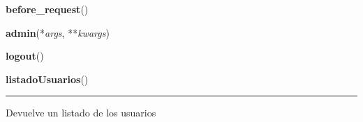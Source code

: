     \label{app:views:before_request}

    \vspace{0.5ex}

\hspace{.8\funcindent}\begin{boxedminipage}{\funcwidth}

    \raggedright \textbf{before\_request}()

\setlength{\parskip}{2ex}
\setlength{\parskip}{1ex}
    \end{boxedminipage}

    \label{app:views:admin}

    \vspace{0.5ex}

\hspace{.8\funcindent}\begin{boxedminipage}{\funcwidth}

    \raggedright \textbf{admin}(*\textit{args}, **\textit{kwargs})

\setlength{\parskip}{2ex}
\setlength{\parskip}{1ex}
    \end{boxedminipage}

    \label{app:views:logout}

    \vspace{0.5ex}

\hspace{.8\funcindent}\begin{boxedminipage}{\funcwidth}

    \raggedright \textbf{logout}()

\setlength{\parskip}{2ex}
\setlength{\parskip}{1ex}
    \end{boxedminipage}

    \label{app:views:listadoUsuarios}

    \vspace{0.5ex}

\hspace{.8\funcindent}\begin{boxedminipage}{\funcwidth}

    \raggedright \textbf{listadoUsuarios}()

    \vspace{-1.5ex}

    \rule{\textwidth}{0.5\fboxrule}
\setlength{\parskip}{2ex}
    Devuelve un listado de los usuarios

\setlength{\parskip}{1ex}
    \end{boxedminipage}

